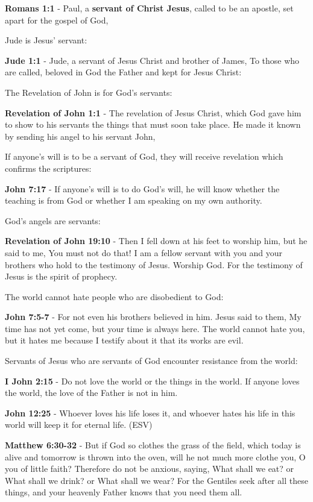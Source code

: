 \documentclass[11pt]{article}
\begin{document}
\textbf{Romans 1:1} - Paul, a \textbf{servant of Christ Jesus}, called to be an apostle, set apart for the gospel of God,

Jude is Jesus' servant:

\textbf{Jude 1:1} - Jude, a servant of Jesus Christ and brother of James, To those who are called, beloved in God the Father and kept for Jesus Christ:

The Revelation of John is for God's servants:

\textbf{Revelation of John 1:1} - The revelation of Jesus Christ, which God gave him to show to his servants the things that must soon take place. He made it known by sending his angel to his servant John,

If anyone's will is to be a servant of God, they will receive revelation which confirms the scriptures:

\textbf{John 7:17} - If anyone's will is to do God's will, he will know whether the teaching is from God or whether I am speaking on my own authority.

God's angels are servants:

\textbf{Revelation of John 19:10} - Then I fell down at his feet to worship him, but he said to me, You must not do that! I am a fellow servant with you and your brothers who hold to the testimony of Jesus. Worship God. For the testimony of Jesus is the spirit of prophecy.

The world cannot hate people who are disobedient to God:

\textbf{John 7:5-7} - For not even his brothers believed in him. Jesus said to them, My time has not yet come, but your time is always here. The world cannot hate you, but it hates me because I testify about it that its works are evil.

Servants of Jesus who are servants of God encounter resistance from the world:

\textbf{I John 2:15} - Do not love the world or the things in the world. If anyone loves the world, the love of the Father is not in him.

\textbf{John 12:25} -  Whoever loves his life loses it, and whoever hates his life in this world will keep it for eternal life.  (ESV)

\textbf{Matthew 6:30-32} - But if God so clothes the grass of the field, which today is alive and tomorrow is thrown into the oven, will he not much more clothe you, O you of little faith? Therefore do not be anxious, saying, What shall we eat? or What shall we drink? or What shall we wear? For the Gentiles seek after all these things, and your heavenly Father knows that you need them all.
\end{document}
